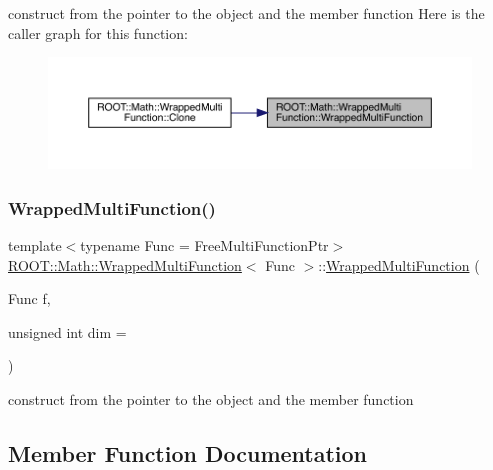 construct from the pointer to the object and the member function Here is the caller graph for this function\+:\nopagebreak
\begin{figure}[H]
\begin{center}
\leavevmode
\includegraphics[width=350pt]{de/da4/classROOT_1_1Math_1_1WrappedMultiFunction_a015f33dec6c241c6b5662df06ea4ddb9_icgraph}
\end{center}
\end{figure}
\mbox{\label{classROOT_1_1Math_1_1WrappedMultiFunction_a015f33dec6c241c6b5662df06ea4ddb9}} 
\subsubsection{\texorpdfstring{WrappedMultiFunction()}{WrappedMultiFunction()}\hspace{0.1cm}{\footnotesize\ttfamily [2/2]}}
{\footnotesize\ttfamily template$<$typename Func  = Free\+Multi\+Function\+Ptr$>$ \\
\mbox{\hyperlink{classROOT_1_1Math_1_1WrappedMultiFunction}{R\+O\+O\+T\+::\+Math\+::\+Wrapped\+Multi\+Function}}$<$ Func $>$\+::\mbox{\hyperlink{classROOT_1_1Math_1_1WrappedMultiFunction}{Wrapped\+Multi\+Function}} (\begin{DoxyParamCaption}\item[{Func}]{f,  }\item[{unsigned int}]{dim = {} }\end{DoxyParamCaption})\hspace{0.3cm}{\ttfamily [inline]}}

construct from the pointer to the object and the member function 

\subsection{Member Function Documentation}
\mbox{\label{classROOT_1_1Math_1_1WrappedMultiFunction_aafa24e359a607b4278f1bf238bdbc336}} 
